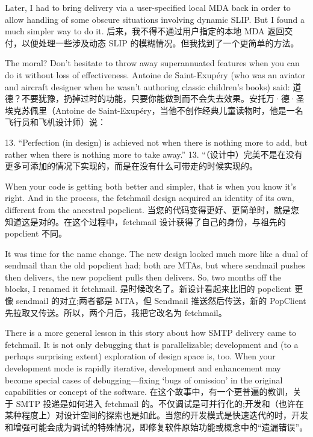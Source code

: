 \documentclass[a4paper,12pt,UTF8,twoside]{ctexbook}
\begin{document}
Later, I had to bring delivery via a user-specified local MDA back in order to allow handling of some obscure situations involving dynamic SLIP. But I found a much simpler way to do it.
后来，我不得不通过用户指定的本地 MDA 返回交付，以便处理一些涉及动态 SLIP 的模糊情况。但我找到了一个更简单的方法。

The moral? Don't hesitate to throw away superannuated features when you can do it without loss of effectiveness. Antoine de Saint-Exupéry (who was an aviator and aircraft designer when he wasn't authoring classic children's books) said:
道德？不要犹豫，扔掉过时的功能，只要你能做到而不会失去效果。安托万·德·圣埃克苏佩里（Antoine de Saint-Exupéry，当他不创作经典儿童读物时，他是一名飞行员和飞机设计师）说：

13. ``Perfection (in design) is achieved not when there is nothing more to add, but rather when there is nothing more to take away.''
13. “（设计中）完美不是在没有更多可添加的情况下实现的，而是在没有什么可带走的时候实现的。

When your code is getting both better and simpler, that is when you know it's right. And in the process, the fetchmail design acquired an identity of its own, different from the ancestral popclient.
当您的代码变得更好、更简单时，就是您 知道这是对的。在这个过程中，fetchmail 设计获得了自己的身份，与祖先的 popclient 不同。

It was time for the name change. The new design looked much more like a dual of sendmail than the old popclient had; both are MTAs, but where sendmail pushes then delivers, the new popclient pulls then delivers. So, two months off the blocks, I renamed it fetchmail.
是时候改名了。新设计看起来比旧的 popclient 更像 sendmail 的对立;两者都是 MTA，但 Sendmail 推送然后传送，新的 PopClient 先拉取又传送。所以，两个月后，我把它改名为 fetchmail。

There is a more general lesson in this story about how SMTP delivery came to fetchmail. It is not only debugging that is parallelizable; development and (to a perhaps surprising extent) exploration of design space is, too. When your development mode is rapidly iterative, development and enhancement may become special cases of debugging—fixing `bugs of omission' in the original capabilities or concept of the software.
在这个故事中，有一个更普遍的教训，关于 SMTP 投递是如何进入 fetchmail 的。不仅调试是可并行化的;开发和（也许在某种程度上）对设计空间的探索也是如此。当您的开发模式是快速迭代的时，开发和增强可能会成为调试的特殊情况，即修复软件原始功能或概念中的“遗漏错误”。
\end{document}
